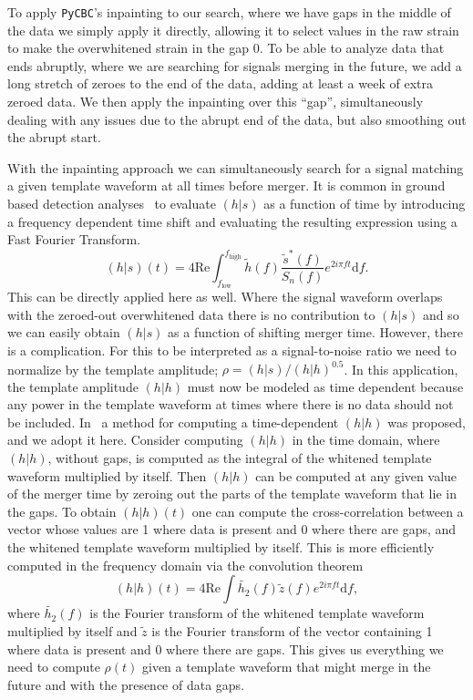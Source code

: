 To apply \texttt{PyCBC}'s inpainting to our search, where we have gaps in the middle of the data we simply apply it directly, allowing it to select values in the raw strain to make the overwhitened strain in the gap 0.
To be able to analyze data that ends abruptly, where we are searching for signals merging in the future, we add a long stretch of zeroes to the end of the data, adding at least a week of extra zeroed data.
We then apply the inpainting over this ``gap'', simultaneously dealing with any issues due to the abrupt end of the data, but also smoothing out the abrupt start.

With the inpainting approach we can simultaneously search for a signal matching a given template waveform at all times before merger.
It is common in ground based detection analyses~\cite{Allen:2005fk} to evaluate $(h|s)$ as a function of time by introducing a frequency dependent time shift and evaluating the resulting expression using a Fast Fourier Transform.
%
\begin{equation}
    (h|s)(t) = 4\mathrm{Re}\int_{f_\mathrm{low}}^{f_\mathrm{high}} \tilde{h}(f) \frac{\tilde{s}^*(f)}{S_n(f)} e^{2 i \pi f t} \mathrm{d} f.
\end{equation}
%
This can be directly applied here as well. Where the signal waveform overlaps with the zeroed-out
overwhitened data there is no contribution to $(h|s)$ and so we can easily obtain $(h|s)$ as a function of shifting merger time.
However, there is a complication. For this to be interpreted as a signal-to-noise ratio we need to normalize by the template amplitude; $\rho = (h|s) / (h|h)^{0.5}$.
In this application, the template amplitude $(h|h)$ must now be modeled as time dependent because any power in the template waveform at times where there is no data should not be included.
In~\cite{Zackay:2019kkv} a method for computing a time-dependent $(h|h)$ was proposed, and we adopt it here.
Consider computing $(h|h)$ in the time domain, where $(h|h)$, without gaps, is computed as the integral of the whitened template waveform multiplied by itself.
Then $(h|h)$ can be computed at any given value of the merger time by zeroing out the parts of the template waveform that lie in the gaps.
To obtain $(h|h)(t)$ one can compute the cross-correlation between a vector whose values are 1 where data is present and 0 where there are gaps, and the whitened template waveform multiplied by itself.
This is more efficiently computed in the frequency domain via the convolution theorem
%
\begin{equation}
    (h|h)(t) = 4\mathrm{Re}\int \tilde{h_2}(f) \tilde{z}(f) e^{2 i \pi f t} \mathrm{d} f,
\end{equation}
%
where $\tilde{h_2}(f)$ is the Fourier transform of the whitened template waveform multiplied by itself and $\tilde{z}$ is the Fourier transform
of the vector containing 1 where data is present and 0 where there are gaps.
This gives us everything we need to compute $\rho(t)$ given a template waveform that might merge in the future and with the presence of data gaps.

